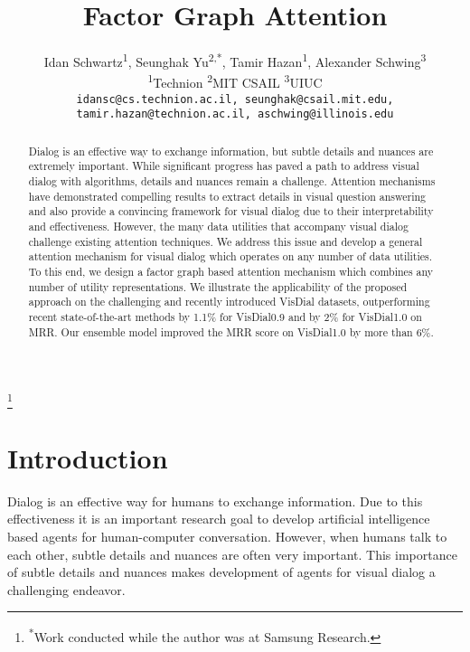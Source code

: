 \documentclass[10pt,twocolumn,letterpaper]{article}
\newcommand\blfootnote[1]{\begingroup
  \renewcommand\thefootnote{}\footnote{#1}\addtocounter{footnote}{-1}\endgroup
}
\begin{document}
\title{Factor Graph Attention\vspace{-0.5cm}}

\author{
Idan Schwartz\textsuperscript{1}, Seunghak Yu\textsuperscript{2,*}, Tamir Hazan\textsuperscript{1}, Alexander Schwing\textsuperscript{3}\\
\textsuperscript{1}Technion \hspace{1cm}\textsuperscript{2}MIT CSAIL \hspace{1cm}\textsuperscript{3}UIUC\\
{\tt\footnotesize idansc@cs.technion.ac.il, seunghak@csail.mit.edu, tamir.hazan@technion.ac.il, aschwing@illinois.edu}
\vspace{-0.5cm}
}



\maketitle

\begin{abstract}
	Dialog is an effective way to exchange information, but subtle details and nuances are extremely important. While significant progress has paved a path   to address visual dialog with algorithms,  details and nuances remain a challenge. Attention mechanisms have demonstrated compelling results to extract details in visual question answering and also provide a convincing framework for visual dialog due to their interpretability and effectiveness. However, the many data utilities that accompany visual dialog challenge  existing attention techniques. We address this issue and develop a general attention mechanism for visual dialog which operates on any number of data utilities. To this end, we design a factor graph based attention mechanism which combines any number of utility representations. We illustrate the applicability of the proposed approach on the challenging and recently introduced VisDial datasets, outperforming recent state-of-the-art methods by 1.1\% for VisDial0.9 and by 2\% for VisDial1.0 on MRR. Our ensemble model improved the MRR score on VisDial1.0 by more than 6\%. \end{abstract} \blfootnote{\textsuperscript{*}Work conducted while the author was at Samsung Research.}
\section{Introduction}
Dialog is an effective way for humans to exchange information. 
 Due to this effectiveness it is an important research goal to develop artificial intelligence based agents for human-computer conversation. However, when humans talk to each other, subtle details and nuances are often very important. This importance of subtle details and nuances makes development of agents for visual dialog  a challenging endeavor. 
\end{document}
